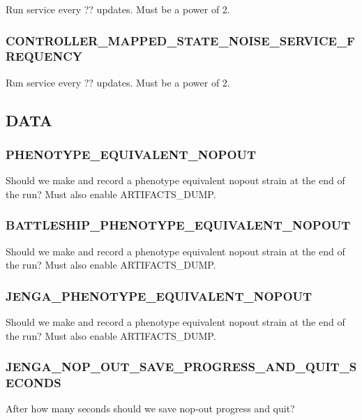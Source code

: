 
Run service every ?? updates.
Must be a power of 2.

\subsubsection{CONTROLLER\_MAPPED\_STATE\_NOISE\_SERVICE\_FREQUENCY}


Run service every ?? updates.
Must be a power of 2.

\subsection{DATA}

\subsubsection{PHENOTYPE\_EQUIVALENT\_NOPOUT}


Should we make and record a phenotype equivalent nopout strain at the end of the run? Must also enable ARTIFACTS\_DUMP.

\subsubsection{BATTLESHIP\_PHENOTYPE\_EQUIVALENT\_NOPOUT}


Should we make and record a phenotype equivalent nopout strain at the end of the run?
Must also enable ARTIFACTS\_DUMP.

\subsubsection{JENGA\_PHENOTYPE\_EQUIVALENT\_NOPOUT}


Should we make and record a phenotype equivalent nopout strain at the end of the run?
Must also enable ARTIFACTS\_DUMP.

\subsubsection{JENGA\_NOP\_OUT\_SAVE\_PROGRESS\_AND\_QUIT\_SECONDS}


After how many seconds should we save nop-out progress and quit?

